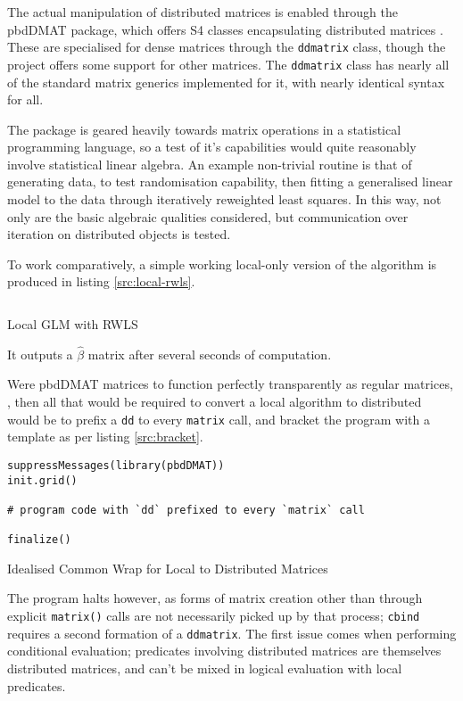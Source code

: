 \documentclass[a4paper,10pt]{article}
\begin{document}
The actual manipulation of distributed matrices is enabled through the pbdDMAT
package, which offers S4 classes encapsulating distributed matrices
\cite{pbdDMATpackage}. These are specialised for dense matrices through the
\texttt{ddmatrix} class, though the project offers some support for other
matrices. The \texttt{ddmatrix} class has nearly all of the standard matrix
generics implemented for it, with nearly identical syntax for all.

The package is geared heavily towards matrix operations in a statistical
programming language, so a test of it's capabilities would quite reasonably
involve statistical linear algebra. An example non-trivial routine is that of
generating data, to test randomisation capability, then fitting a generalised
linear model to the data through iteratively reweighted least squares. In this
way, not only are the basic algebraic qualities considered, but communication
over iteration on distributed objects is tested.

To work comparatively, a simple working local-only version of the algorithm is
produced in listing \ref{src:local-rwls}.

\begin{listing}
\inputminted{r}{R/review-rwls.R}
        \caption{Local GLM with RWLS}
        \label{src:local-rwls}
\end{listing}

It outputs a \(\hat{\beta}\) matrix after several seconds of computation.

Were pbdDMAT matrices to function perfectly transparently as regular matrices, , then all that would be required to convert a local algorithm to
distributed would be to prefix a \texttt{dd} to every \texttt{matrix} call, and
bracket the program with a template as per listing \ref{src:bracket}.

\begin{listing}
\begin{verbatim}
suppressMessages(library(pbdDMAT))
init.grid()

# program code with `dd` prefixed to every `matrix` call

finalize()
\end{verbatim}
\caption{Idealised Common Wrap for Local to Distributed Matrices}\label{src:bracket}
\end{listing}

The program halts however, as forms of matrix creation other than through explicit \texttt{matrix()} calls are not necessarily picked up by that process; \texttt{cbind} requires a second formation of a \texttt{ddmatrix}. 
The first issue comes when performing conditional evaluation; predicates involving distributed matrices are themselves distributed matrices, and can't be mixed in logical evaluation with local predicates.
\end{document}
